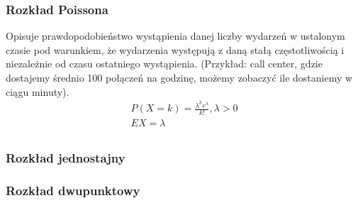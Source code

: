 \subsubsection{Rozkład Poissona}
Opisuje prawdopodobieństwo wystąpienia danej liczby wydarzeń w ustalonym czasie pod warunkiem,
że wydarzenia występują z daną stałą częstotliwością i niezależnie od czasu ostatniego wystąpienia.
(Przykład: call center, gdzie dostajemy średnio 100 połączeń na godzinę, możemy zobaczyć ile dostaniemy w ciągu minuty).
\begin{gather*}
    P(X=k)=\frac{\lambda^ke^{\lambda}}{k!}, \lambda>0\\
    EX=\lambda\\
\end{gather*}

\subsubsection{Rozkład jednostajny}

\subsubsection{Rozkład dwupunktowy}
